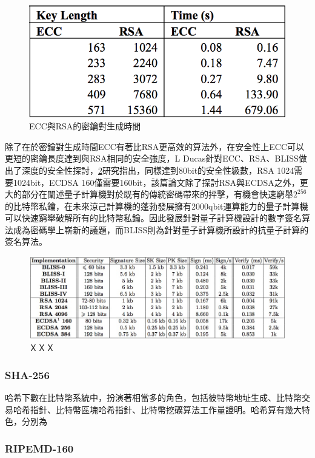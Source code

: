 			\begin{figure}[h]
				\centering
				\includegraphics[width = .5\textwidth]{ECCtime.png}
				\caption{ECC與RSA的密鑰對生成時間\supercite{Performancecomparisonofellipticcurveandrsadigitalsignatures}}\label{ECCtime}
			\end{figure}

			除了在於密鑰對生成時間ECC有著比RSA更高效的算法外，在安全性上ECC可以更短的密鑰長度達到與RSA相同的安全強度，L Ducas針對ECC、RSA、BLISS做出了深度的安全性探討\supercite{LatticesignaturesandbimodalGaussians}，\ref{LatticesignaturesandbimodalGaussians}研究指出，同樣達到80bit的安全性級數，RSA 1024需要1024bit，ECDSA 160僅需要160bit，該篇論文除了探討RSA與ECDSA之外，更大的部分在闡述量子計算機對於既有的傳統密碼帶來的抨擊，有機會快速窮舉$2^{256}$的比特幣私鑰，在未來涼己計算機的蓬勃發展擁有2000qbit運算能力的量子計算機可以快速窮舉破解所有的比特幣私鑰。因此發展針對量子計算機設計的數字簽名算法成為密碼學上嶄新的議題，而BLISS則為針對量子計算機所設計的抗量子計算的簽名算法。

			\begin{figure}[h]
				\centering
				\includegraphics[width = 1\textwidth]{LatticesignaturesandbimodalGaussians.png}
				\caption{ＸＸＸ\supercite{LatticesignaturesandbimodalGaussians}}\label{LatticesignaturesandbimodalGaussians}
			\end{figure}

			\subsubsection{SHA-256}
			哈希下數在比特幣系統中，扮演著相當多的角色，包括彼特幣地址生成、比特幣交易哈希指針、比特幣區塊哈希指針、比特幣挖礦算法工作量證明。哈希算有幾大特色，分別為
			\subsubsection{RIPEMD-160}
